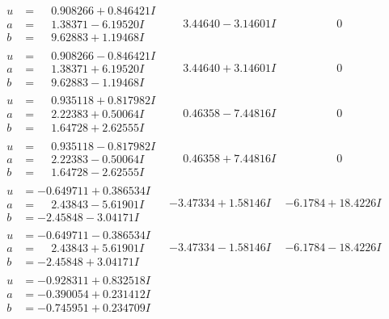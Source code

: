 \documentclass[1p]{elsarticle_modified}
\theoremstyle{definition}
\begin{document}
$$\begin{array}{c|c|c}
\begin{aligned}
u &= \phantom{-}0.908266 + 0.846421 I \\
a &= \phantom{-}1.38371 - 6.19520 I \\
b &= \phantom{-}9.62883 + 1.19468 I\end{aligned}
 & \phantom{-}3.44640 - 3.14601 I & \phantom{-0.000000 } 0 \\ \hline\begin{aligned}
u &= \phantom{-}0.908266 - 0.846421 I \\
a &= \phantom{-}1.38371 + 6.19520 I \\
b &= \phantom{-}9.62883 - 1.19468 I\end{aligned}
 & \phantom{-}3.44640 + 3.14601 I & \phantom{-0.000000 } 0 \\ \hline\begin{aligned}
u &= \phantom{-}0.935118 + 0.817982 I \\
a &= \phantom{-}2.22383 + 0.50064 I \\
b &= \phantom{-}1.64728 + 2.62555 I\end{aligned}
 & \phantom{-}0.46358 - 7.44816 I & \phantom{-0.000000 } 0 \\ \hline\begin{aligned}
u &= \phantom{-}0.935118 - 0.817982 I \\
a &= \phantom{-}2.22383 - 0.50064 I \\
b &= \phantom{-}1.64728 - 2.62555 I\end{aligned}
 & \phantom{-}0.46358 + 7.44816 I & \phantom{-0.000000 } 0 \\ \hline\begin{aligned}
u &= -0.649711 + 0.386534 I \\
a &= \phantom{-}2.43843 - 5.61901 I \\
b &= -2.45848 - 3.04171 I\end{aligned}
 & -3.47334 + 1.58146 I & -6.1784 + 18.4226 I \\ \hline\begin{aligned}
u &= -0.649711 - 0.386534 I \\
a &= \phantom{-}2.43843 + 5.61901 I \\
b &= -2.45848 + 3.04171 I\end{aligned}
 & -3.47334 - 1.58146 I & -6.1784 - 18.4226 I \\ \hline\begin{aligned}
u &= -0.928311 + 0.832518 I \\
a &= -0.390054 + 0.231412 I \\
b &= -0.745951 + 0.234709 I\end{aligned}

\end{array}$$
\end{document}
